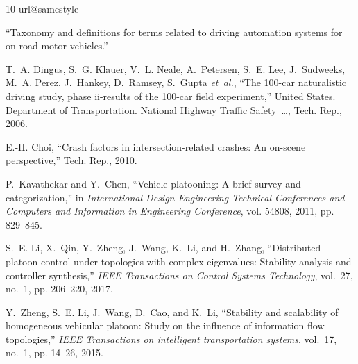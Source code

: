 
%
\begin{thebibliography}{10}
\providecommand{\url}[1]{#1}
\csname url@samestyle\endcsname
\providecommand{\newblock}{\relax}
\providecommand{\bibinfo}[2]{#2}
\providecommand{\BIBentrySTDinterwordspacing}{\spaceskip=0pt\relax}
\providecommand{\BIBentryALTinterwordstretchfactor}{4}
\providecommand{\BIBentryALTinterwordspacing}{\spaceskip=\fontdimen2\font plus
\BIBentryALTinterwordstretchfactor\fontdimen3\font minus
  \fontdimen4\font\relax}
\providecommand{\BIBforeignlanguage}[2]{{%
\expandafter\ifx\csname l@#1\endcsname\relax
\typeout{** WARNING: IEEEtran.bst: No hyphenation pattern has been}%
\typeout{** loaded for the language `#1'. Using the pattern for}%
\typeout{** the default language instead.}%
\else
\language=\csname l@#1\endcsname
\fi
#2}}
\providecommand{\BIBdecl}{\relax}
\BIBdecl

``Taxonomy and definitions for terms related to driving automation systems for
  on-road motor vehicles.''

T.~A. Dingus, S.~G. Klauer, V.~L. Neale, A.~Petersen, S.~E. Lee, J.~Sudweeks,
  M.~A. Perez, J.~Hankey, D.~Ramsey, S.~Gupta \emph{et~al.}, ``The 100-car
  naturalistic driving study, phase ii-results of the 100-car field
  experiment,'' United States. Department of Transportation. National Highway
  Traffic Safety~…, Tech. Rep., 2006.

E.-H. Choi, ``Crash factors in intersection-related crashes: An on-scene
  perspective,'' Tech. Rep., 2010.

P.~Kavathekar and Y.~Chen, ``Vehicle platooning: A brief survey and
  categorization,'' in \emph{International Design Engineering Technical
  Conferences and Computers and Information in Engineering Conference}, vol.
  54808, 2011, pp. 829--845.

S.~E. Li, X.~Qin, Y.~Zheng, J.~Wang, K.~Li, and H.~Zhang, ``Distributed platoon
  control under topologies with complex eigenvalues: Stability analysis and
  controller synthesis,'' \emph{IEEE Transactions on Control Systems
  Technology}, vol.~27, no.~1, pp. 206--220, 2017.

Y.~Zheng, S.~E. Li, J.~Wang, D.~Cao, and K.~Li, ``Stability and scalability of
  homogeneous vehicular platoon: Study on the influence of information flow
  topologies,'' \emph{IEEE Transactions on intelligent transportation systems},
  vol.~17, no.~1, pp. 14--26, 2015.


\end{thebibliography}
